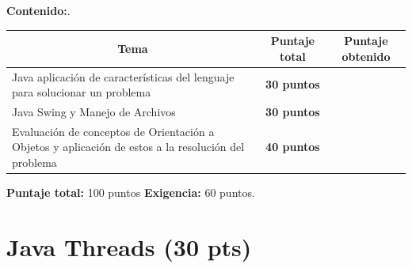 \documentclass{exam}
\begin{document}
\vspace{5mm}
\noindent
\textbf{Contenido:}.

\vspace{2mm}
\noindent
\begin{table}[H]
{\normalsize
\begin{tabular}{|p{9.5cm}|p{3.3cm}|p{3.3cm}|}
\hline
    \multicolumn{1}{|c}{\textbf{Tema}} &
    \multicolumn{1}{|c}{\textbf{Puntaje total}} &
    \multicolumn{1}{|c|}{\textbf{Puntaje obtenido}} \\
\hline
    Java aplicaci\'on de caracter\'isticas del lenguaje para solucionar un problema  &
    \multicolumn{1}{|c|}{\textbf{30 puntos}} & \\
\hline
    Java Swing y Manejo de Archivos &
    \multicolumn{1}{|c|}{\textbf{30 puntos}} & \\
\hline
    Evaluaci\'on de conceptos de Orientaci\'on a Objetos y aplicaci\'on de estos a la resoluci\'on del problema&
    \multicolumn{1}{|c|}{\textbf{40 puntos}} & \\
\hline
\end{tabular}}
\end{table}

\vspace{-2mm}
\noindent
\textbf{Puntaje total:} 100 puntos \textbf{Exigencia:} 60 puntos.

\newpage
\noindent
\section{\textbf{Java Threads (30 pts)}}
\noindent
\end{document}
